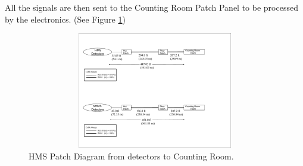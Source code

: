 \documentclass[11pt]{article}
\begin{document}
\newpage
All the signals are then sent to the Counting Room Patch Panel to be processed
by the electronics. (See Figure \ref{fig:hms_patch})
  
\begin{figure}[h]
  \centering
  \includegraphics[width=6.0in, height=2.0in]{HMS_patch.pdf}
  \caption{HMS Patch Diagram from detectors to Counting Room.}
  \label{fig:hms_patch}
\end{figure}
\end{document}
